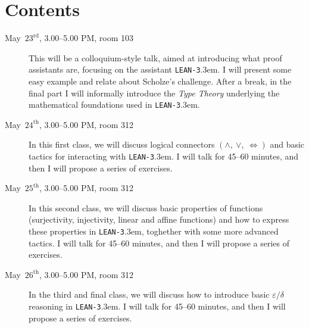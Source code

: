 \documentclass[10pt,francais,a4paper]{amsart}
\newcommand{\Lean}{\texttt{LEAN-3}\kern.3em}
\begin{document}
\section*{Contents}
\begin{description}
\item [May~$23^\text{rd}$, 3.00--5.00 PM, room 103] This will be a colloquium-style talk, aimed at introducing what proof assistants are, focusing on the assistant \Lean. I will present some easy example and relate about Scholze's challenge. After a break, in the final part I will informally introduce the \emph{Type Theory} underlying the mathematical foundations used in \Lean.
\item [May~$24^\text{th}$, 3.00--5.00 PM, room 312] In this first class, we will discuss logical connectors \mbox{$(\land,~\lor,~\iff)$} and basic tactics for interacting with \Lean. I will talk for 45--60 minutes, and then I will propose a series of exercises.
\item [May~$25^\text{th}$, 3.00--5.00 PM, room 312] In this second class, we will discuss basic properties of functions (surjectivity, injectivity, linear and affine functions) and how to express these properties in \Lean, toghether with some more advanced tactics. I will talk for 45--60 minutes, and then I will propose a series of exercises.
\item [May~$26^\text{th}$, 3.00--5.00 PM, room 312] In the third and final class, we will discuss how to introduce basic $\varepsilon/\delta$ reasoning in \Lean. I will talk for 45--60 minutes, and then I will propose a series of exercises.
\end{description}




\end{document}
